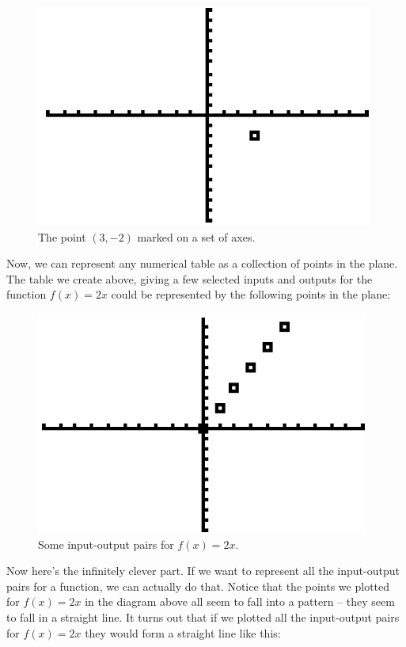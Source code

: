 \begin{figure}[H]
	\centering
	\includegraphics[scale=1.0]{Sections/FunctionsandGraphsImages/Figure04.png}
	\caption{The point $(3,-2)$ marked on a set of axes.}
\end{figure}

Now, we can represent any numerical table as a collection of points in the plane. The table we create above, giving a few selected inputs and outputs for the function $f(x)=2x$ could be represented by the following points in the plane:

\begin{figure}[H]
	\centering
	\includegraphics[scale=1.0]{Sections/FunctionsandGraphsImages/Figure05.png}
	\caption{Some input-output pairs for $f(x)=2x$.}
\end{figure}

Now here’s the infinitely clever part. If we want to represent all the input-output pairs for a function, we can actually do that. Notice that the points we plotted for $f(x)=2x$ in the diagram above all seem to fall into a pattern – they seem to fall in a straight line. It turns out that if we plotted all the input-output pairs for $f(x)=2x$ they would form a straight line like this:

